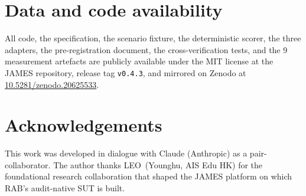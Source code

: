\documentclass[11pt,a4paper]{article}
\begin{document}
\section*{Data and code availability}
All code, the specification, the scenario fixture, the deterministic scorer, the three adapters, the pre-registration document, the cross-verification tests, and the 9 measurement artefacts are publicly available under the MIT license at the JAMES repository, release tag \texttt{v0.4.3}, and mirrored on Zenodo at \href{https://doi.org/10.5281/zenodo.20625533}{10.5281/zenodo.20625533}.

\section*{Acknowledgements}
This work was developed in dialogue with Claude (Anthropic) as a pair-collaborator. The author thanks LEO~(Younghu, AIS Edu HK) for the foundational research collaboration that shaped the JAMES platform on which RAB's audit-native SUT is built.



\end{document}
